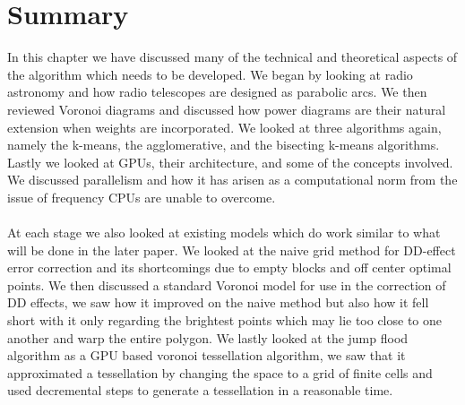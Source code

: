\section{Summary}\label{sum}
In this chapter we have discussed many of the technical and theoretical aspects of the algorithm which needs to be developed. We began by looking at radio astronomy and how radio telescopes are designed as parabolic arcs. We then reviewed Voronoi diagrams and discussed how power diagrams are their natural extension when weights are incorporated. We looked at three algorithms again, namely the k-means, the agglomerative, and the bisecting k-means algorithms. Lastly we looked at GPUs, their architecture, and some of the concepts involved. We discussed parallelism and how it has arisen as a computational norm from the issue of frequency CPUs are unable to overcome.
\\
\\
At each stage we also looked at existing models which do work similar to what will be done in the later paper. We looked at the naive grid method for DD-effect error correction and its shortcomings due to empty blocks and off center optimal points. We then discussed a standard Voronoi model for use in the correction of DD effects, we saw how it improved on the naive method but also how it fell short with it only regarding the brightest points which may lie too close to one another and warp the entire polygon. We lastly looked at the jump flood algorithm as a GPU based voronoi tessellation algorithm, we saw that it approximated a tessellation by changing the space to a grid of finite cells and used decremental steps to generate a tessellation in a reasonable time.

